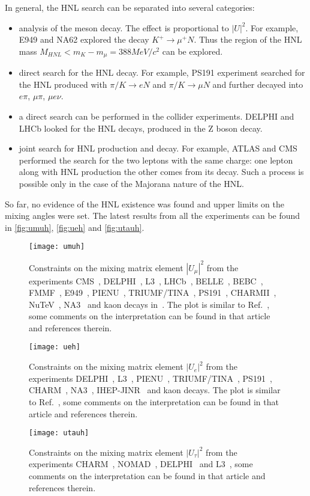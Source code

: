 \documentclass[../main.tex]{subfiles}
\begin{document}
In general, the HNL search can be separated into several categories:
\begin{itemize}
  \item analysis of the meson decay. The effect is proportional to $\left|U\right|^2$. For example, E949 and NA62 explored the decay $K^+\to\mu^+N$. Thus the region of the HNL mass $M_{HNL} < m_K-m_\mu=388 MeV/c^2$ can be explored.
  \item direct search for the HNL decay. For example, PS191 experiment searched for the HNL produced with $\pi/K\to eN$ and $\pi/K\to\mu N$ and further decayed into $e\pi$, $\mu\pi$, $\mu e\nu$.
  \item a direct search can be performed in the collider experiments. DELPHI and LHCb looked for the HNL decays, produced in the Z boson decay.
  \item joint search for HNL production and decay. For example, ATLAS and CMS performed the search for the two leptons with the same charge: one lepton along with HNL production the other comes from its decay. Such a process is possible only in the case of the Majorana nature of the HNL.
\end{itemize}

So far, no evidence of the HNL existence was found and upper limits on the mixing angles were set. The latest results from all the experiments can be found in \autoref{fig:umuh}, \autoref{fig:ueh} and \autoref{fig:utauh}.

\begin{figure}[!ht]
\centering
\texttt{[image: umuh]}
\caption{Constraints on the mixing matrix element $|U_{\mu}|^2$ from the experiments CMS~\cite{cms}, DELPHI~\cite{delphi}, L3~\cite{l3}, LHCb~\cite{lhcb}, BELLE~\cite{belle}, BEBC~\cite{bebc}, FMMF~\cite{fmmf}, E949~\cite{e949}, PIENU~\cite{pienu}, TRIUMF/TINA~\cite{triumf}, PS191~\cite{Bernardi1988}, CHARMII~\cite{charm2}, NuTeV~\cite{nutev}, NA3~\cite{na3} and kaon decays in~\cite{kaon2}. The plot is similar to Ref.~\cite{drewes}, some comments on the interpretation can be found in that article and references therein.}
\label{fig:umuh}
\end{figure}
\begin{figure}[!ht]
\centering
\texttt{[image: ueh]}
\caption{Constraints on the mixing matrix element $|U_{e}|^2$ from the experiments  DELPHI~\cite{delphi},  L3~\cite{l3}, PIENU~\cite{pienu}, TRIUMF/TINA~\cite{triumf}, PS191~\cite{Bernardi1988}, CHARM~\cite{charm}, NA3~\cite{na3}, IHEP-JINR~\cite{jinr} and kaon decays. The plot is similar to Ref.~\cite{drewes}, some comments on the interpretation can be found in that article and references therein.}
\label{fig:ueh}
\end{figure}
\begin{figure}[!ht]
\centering
\texttt{[image: utauh]}
\caption{Constraints on the mixing matrix element $|U_{\tau}|^2$ from the experiments  CHARM~\cite{orloff2002limits}, NOMAD~\cite{baldisseris2001search}, DELPHI~\cite{delphi} and L3~\cite{l3}, some comments on the interpretation can be found in that article and references therein.}
\label{fig:utauh}
\end{figure}
\end{document}
